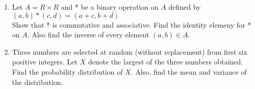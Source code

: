 \documentclass[12pt,-letter paper]{article}
\theoremstyle{remark}
\begin{document}
\begin{enumerate}
\item Let $A=R\times R$ and * be a binary operation on $A$ defined by $(a,b)*(c,d) = (a+c,b+d)$\\
Show that * is commutative and associative. Find the identity elemeny for * on $A$. Also find the inverse of every element $(a, b) \in A$.\\

\item Three numbers are selected at random (without replacement) from first six positive integers. Let $X$ denote the largest of the three numbers obtained. Find the probability distribution of $X$. Also, find the mean and variance of the distribution.

\end{enumerate}
\end{document}
